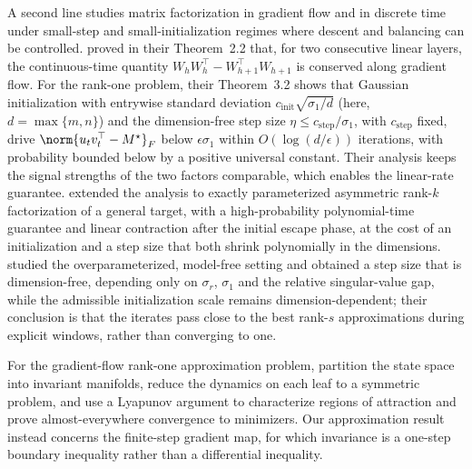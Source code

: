 \documentclass{article}
\begin{document}
A second line studies matrix factorization in gradient flow and in discrete
time under small-step and small-initialization regimes where descent and
balancing can be controlled. \citet{du2018algorithmic}
proved in their Theorem~2.2 that, for two consecutive linear layers, the
continuous-time quantity $W_hW_h^\top-W_{h+1}^\top W_{h+1}$ is conserved along
gradient flow. For the rank-one problem, their Theorem~3.2 shows that Gaussian
initialization with entrywise standard deviation
$c_{\mathrm{init}}\sqrt{\sigma_1/d}$ (here, $d = \max\{m, n\}$) and the dimension-free step size
$\eta\le c_{\mathrm{step}}/\sigma_1$, with $c_{\mathrm{step}}$ fixed, drive
$\norm{u_tv_t^\top-M^\star}_F$ below $\epsilon\sigma_1$ within
$O(\log(d/\epsilon))$ iterations, with probability bounded below by a positive
universal constant. Their analysis keeps the signal strengths of the two
factors comparable, which enables the linear-rate guarantee.
\citet{ye2021global} extended the analysis to exactly parameterized asymmetric
rank-$k$ factorization of a general target, with a high-probability
polynomial-time guarantee and linear contraction after the initial escape
phase, at the cost of an initialization and a step size that both shrink
polynomially in the dimensions. \citet{jiang2023algorithmic} studied the
overparameterized, model-free setting and obtained a step size that is
dimension-free, depending only on $\sigma_r$, $\sigma_1$ and the relative
singular-value gap, while the admissible initialization scale remains
dimension-dependent; their conclusion is that the iterates pass close to the
best rank-$s$ approximations during explicit windows, rather than converging to
one.

For the gradient-flow rank-one approximation problem,
\citet{mohammadi2018stability} partition the state space into invariant
manifolds, reduce the dynamics on each leaf to a symmetric problem, and use a
Lyapunov argument to characterize regions of attraction and prove
almost-everywhere convergence to minimizers. Our approximation result instead
concerns the finite-step gradient map, for which invariance is a one-step
boundary inequality rather than a differential inequality.
\end{document}
